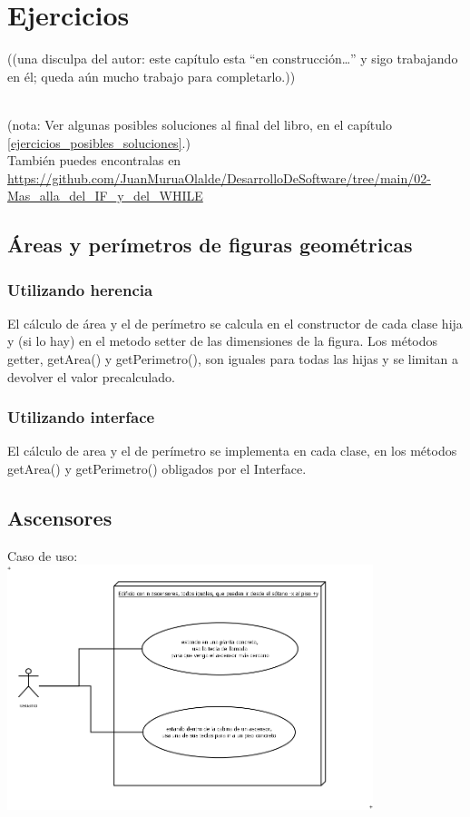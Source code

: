\documentclass[spanish,12pt,a4paper,final,oneside]{book}
\begin{document}
\chapter{Ejercicios}\label{ejercicios_oop}

\begin{footnotesize}((una disculpa del autor: este capítulo esta ``en construcción\ldots'' y sigo trabajando en él; queda aún mucho trabajo para completarlo.))\end{footnotesize}
\\

(nota: Ver algunas posibles soluciones al final del libro, en el capítulo \ref{ejercicios_posibles_soluciones}.)
\\{\scriptsize También puedes encontralas en \url{https://github.com/JuanMuruaOlalde/DesarrolloDeSoftware/tree/main/02-Mas_alla_del_IF_y_del_WHILE}}
\\

\section{Áreas y perímetros de figuras geométricas}
\subsection{Utilizando herencia}
El cálculo de área y el de perímetro se calcula en el constructor de cada clase hija y (si lo hay) en el metodo setter de las dimensiones de la figura. Los métodos getter, getArea() y getPerimetro(), son iguales para todas las hijas y se limitan a devolver el valor precalculado.
\subsection{Utilizando interface}
El cálculo de area y el de perímetro se implementa en cada clase, en los métodos getArea() y getPerimetro() obligados por el Interface.


\section{Ascensores}\label{ejercicio_ascensores}

Caso de uso:
\\ \includegraphics[width=0.8\textwidth]{ascensores - caso de uso} 
\end{document}
